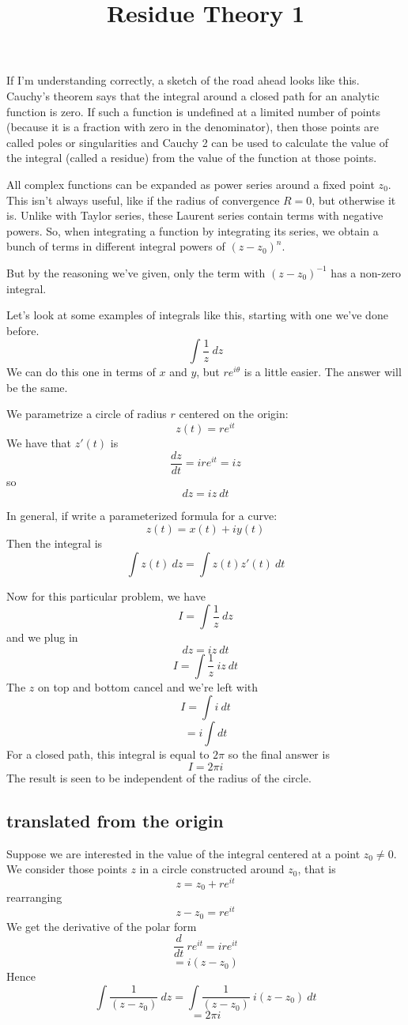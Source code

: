 \documentclass[11pt, oneside]{article}   	%
\title{Residue Theory 1}
\date{}							%
\begin{document}
\maketitle
\Large
If I'm understanding correctly, a sketch of the road ahead looks like this.  Cauchy's theorem says that the integral around a closed path for an analytic function is zero.  If such a function is undefined at a limited number of points (because it is a fraction with zero in the denominator), then those points are called poles or singularities and Cauchy 2 can be used to calculate the value of the integral (called a residue) from the value of the function at those points.

All complex functions can be expanded as power series around a fixed point $z_0$.  This isn't always useful, like if the radius of convergence $R = 0$, but otherwise it is.  Unlike with Taylor series, these Laurent series contain terms with negative powers.  So, when integrating a function by integrating its series, we obtain a bunch of terms in different integral powers of $(z-z_0)^n$.

But by the reasoning we've given, only the term with $(z-z_0)^{-1}$ has a non-zero integral.

Let's look at some examples of integrals like this, starting with one we've done before.
\[ \int \frac{1}{z} \ dz \]
We can do this one in terms of $x$ and $y$, but $r e^{i \theta}$ is a little easier.  The answer will be the same.

We parametrize a circle of radius $r$ centered on the origin:
\[ z(t) = r e^{it} \]
We have that $z'(t)$ is
\[ \frac{dz}{dt} = i r e^{it} = i z \]
so
\[ dz = i z \ dt \]

In general, if write a parameterized formula for a curve:
\[ z(t) = x(t) + iy(t) \]
Then the integral is
\[ \int z(t) \ dz = \int z(t) z'(t) \ dt \]

Now for this particular problem, we have
\[ I = \int \frac{1}{z} \ dz \]
and we plug in 
\[ dz = i z \ dt \]
\[ I = \int \frac{1}{z} \ i z \ dt \]
The $z$ on top and bottom cancel and we're left with
\[ I = \int i \ dt \]
\[ = i \int dt \]
For a closed path, this integral is equal to $2 \pi$ so the final answer is 
\[ I = 2 \pi i \]
The result is seen to be independent of the radius of the circle.

\subsection*{translated from the origin}
Suppose we are interested in the value of the integral centered at a point $z_0 \ne 0$.  We consider those points $z$ in a circle constructed around $z_0$, that is
\[ z = z_0 + re^{it} \]
rearranging
\[ z - z_0 = re^{it} \]
We get the derivative of the polar form
\[ \frac{d}{dt} \ re^{it} = i re^{it}  \]
\[ = i(z-z_0) \]
Hence
\[ \int \frac{1}{(z-z_0)} \ dz  = \int \frac{1}{(z-z_0)} \ i(z - z_0) \ dt \]
\[ = 2 \pi i \]
\end{document}
